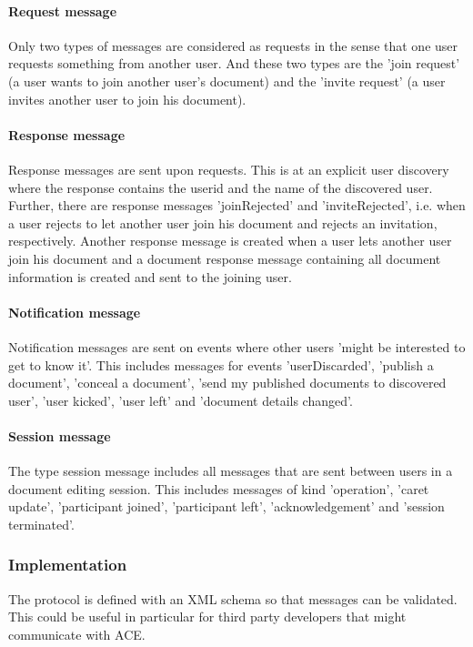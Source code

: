 \paragraph{Request message}
Only two types of messages are considered as requests in the sense that one user requests something from another user. And these two types are the 'join request' (a user wants to join another user's document) and the 'invite request' (a user invites another user to join his document).

\paragraph{Response message}
Response messages are sent upon requests. This is at an explicit user discovery where the response contains the userid and the name of the discovered user. Further, there are response messages 'joinRejected' and 'inviteRejected', i.e. when a user rejects to let another user join his document and rejects an invitation, respectively. Another response message is created when a user lets another user join his document and a document response message containing all document information is created and sent to the joining user.

\paragraph{Notification message}
Notification messages are sent on events where other users 'might be interested to get to know it'. This includes messages for events 'userDiscarded', 'publish a document', 'conceal a document', 'send my published documents to discovered user', 'user kicked', 'user left' and 'document details changed'.

\paragraph{Session message}
The type session message includes all messages that are sent between users in a document editing session. This includes messages of kind 'operation', 'caret update', 'participant joined', 'participant left', 'acknowledgement' and 'session terminated'.


\subsubsection{Implementation}
The protocol is defined with an XML schema so that messages can be validated. This could be useful in particular for third party developers that might communicate with ACE.

